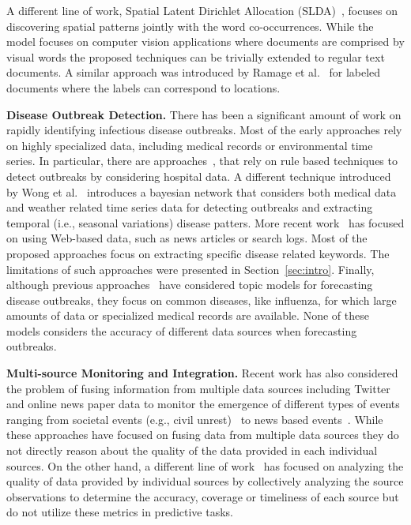 \documentclass[twoside,leqno,twocolumn]{article}
\begin{document}
A different line of work, Spatial Latent Dirichlet Allocation (SLDA)~\cite{wang:2007}, focuses on discovering spatial patterns jointly with the word co-occurrences. While the model focuses on computer vision applications where documents are comprised by visual words the proposed techniques can be trivially extended to regular text documents. A similar approach was introduced by Ramage et al.~\cite{ramage:2009} for labeled documents where the labels can correspond to locations.

\vspace{5pt}\noindent\textbf{Disease Outbreak Detection.} There has been a significant amount of work on rapidly identifying infectious disease outbreaks. Most of the early approaches rely on highly specialized data, including medical records or environmental time series. In particular, there are approaches~\cite{brossette1998association, wong:02}, that rely on rule based techniques to detect outbreaks by considering hospital data. A different technique introduced by Wong et al.~\cite{wong:03} introduces a bayesian network that considers both medical data and weather related time series data for detecting outbreaks and extracting temporal (i.e., seasonal variations) disease patters. More recent work~\cite{althouse, brownstein:2008,linge:09} has focused on using Web-based data, such as news articles or search logs. Most of the proposed approaches focus on extracting specific disease related keywords. The limitations of such approaches were presented in Section~\ref{sec:intro}. Finally, although previous approaches~\cite{paul:11,rider:2013,sadilek:2012} have considered topic models for forecasting disease outbreaks, they focus on common diseases, like influenza, for which large amounts of data or specialized medical records are available. None of these models considers the accuracy of different data sources when forecasting outbreaks. 

\vspace{5pt}\noindent\textbf{Multi-source Monitoring and Integration.} Recent work has also considered the problem of fusing information from multiple data sources including Twitter and online news paper data to monitor the emergence of different types of events ranging from societal events (e.g., civil unrest)~\cite{Ramakrishnan:2014:BNE:2623330.2623373,zhao} to news based events~\cite{Gruenheid:2015:SCC:2723372.2735356,Leban:2014:ERL:2567948.2577024}. While these approaches have focused on fusing data from multiple data sources they do not directly reason about the quality of the data provided in each individual sources. On the other hand, a different line of work~\cite{Dong:2012:LMS:2535568.2448938, Li:2016:STD:2897350.2897352, Qi:2013:MCI:2488388.2488479, rekatsinas:cidr15, Rekatsinas:2014:CSF:2588555.2610504} has focused on analyzing the quality of data provided by individual sources by collectively analyzing the source observations to determine the accuracy, coverage or timeliness of each source but do not utilize these metrics in predictive tasks.
\end{document}
